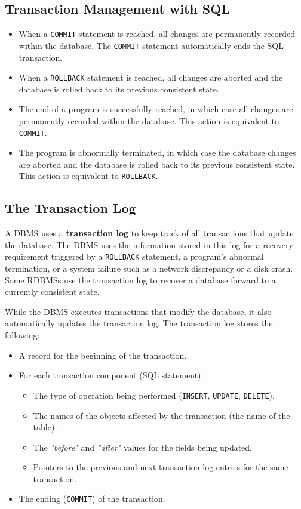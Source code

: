 \documentclass[a4paper, 11pt, titlepage]{report}
\begin{document}
\subsection{Transaction Management with SQL}
\begin{itemize}
\item When a \texttt{COMMIT} statement is reached, all changes are permanently recorded within the database. The \texttt{COMMIT} statement automatically ends the SQL transaction.
\item When a \texttt{ROLLBACK} statement is reached, all changes are aborted and the database is rolled back to its previous consistent state.
\item The end of a program is successfully reached, in which case all changes are permanently recorded within the database. This action is equivalent to \texttt{COMMIT}.
\item The program is abnormally terminated, in which case the database changes are aborted and the database is rolled back to its previous consistent state. This action is equivalent to \texttt{ROLLBACK}.
\end{itemize}
\subsection{The Transaction Log}
A DBMS uses a \textbf{transaction log} to keep track of all transactions that update the database. The DBMS uses the information stored in this log for a recovery requirement triggered by a \texttt{ROLLBACK} statement, a program's abnormal termination, or a system failure such as a network discrepancy or a disk crash. Some RDBMSs use the transaction log to recover a database forward to a currently consistent state.

While the DBMS executes transactions that modify the database, it also automatically updates the transaction log. The transaction log stores the following:
\begin{itemize}
\item A record for the beginning of the transaction.
\item For each transaction component (SQL statement):
\begin{itemize}
\item The type of operation being performed (\texttt{INSERT}, \texttt{UPDATE}, \texttt{DELETE}).
\item The names of the objects affected by the transaction (the name of the table).
\item The \textit{"before"} and \textit{"after"} values for the fields being updated.
\item Pointers to the previous and next transaction log entries for the same transaction.
\end{itemize}
\item The ending (\texttt{COMMIT}) of the transaction.
\end{itemize}
\end{document}
